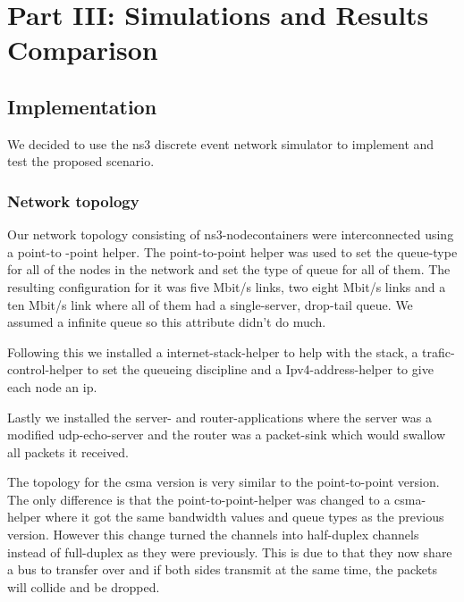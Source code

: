 \documentclass{article}
\begin{document}
\section{Part III: Simulations and Results Comparison} \label{part3}

\subsection{Implementation}
We decided to use the ns3 discrete event network simulator to implement and test the proposed scenario.



\subsubsection{Network topology}
Our network topology consisting of ns3-nodecontainers were interconnected using a point-to
-point helper. The point-to-point helper was used to set the queue-type for all of the
nodes in the network and set the type of queue for all of them. The resulting configuration
for it was five Mbit/s links, two eight Mbit/s links and a ten Mbit/s link where all of
them had a single-server, drop-tail queue. We assumed a infinite queue so this attribute
didn't do much. 

Following this we installed a internet-stack-helper to help with the stack, a
trafic-control-helper to set the queueing discipline and a Ipv4-address-helper to give each
node an ip. 

Lastly we installed the server- and router-applications where the server was a modified
udp-echo-server and the router was a packet-sink which would swallow all packets it
received. 

The topology for the csma version is very similar to the point-to-point version. The only
difference is that the point-to-point-helper was changed to a csma-helper where it got the
same bandwidth values and queue types as the previous version. However this change turned
the channels into half-duplex channels instead of full-duplex as they were previously. This
is due to that they now share a bus to transfer over and if both sides transmit at the same
time, the packets will collide and be dropped.
\end{document}
